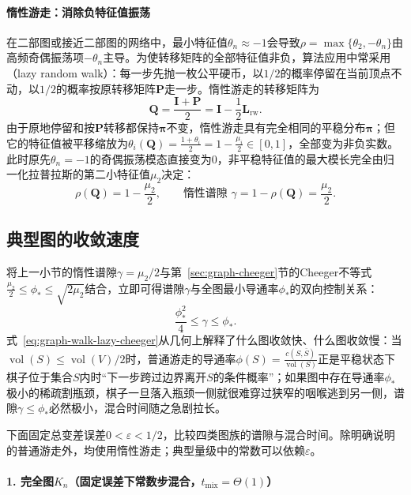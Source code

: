 \paragraph{惰性游走：消除负特征值振荡}

在二部图或接近二部图的网络中，最小特征值$\theta_n\approx -1$会导致$\rho=\max\{\theta_2,-\theta_n\}$由高频奇偶振荡项$-\theta_n$主导。为使转移矩阵的全部特征值非负，算法应用中常采用（lazy random walk）：每一步先抛一枚公平硬币，以$1/2$的概率停留在当前顶点不动，以$1/2$的概率按原转移矩阵$\bm P$走一步。惰性游走的转移矩阵为
\begin{equation}
\bm{Q}=\frac{\bm{I}+\bm{P}}{2}=\bm I - \frac12\bm L_{\mathrm{rw}}.
\label{eq:graph-walk-lazy-transition}
\end{equation}
由于原地停留和按$\bm P$转移都保持$\bm\pi$不变，惰性游走具有完全相同的平稳分布$\bm\pi$；但它的特征值被平移缩放为$\theta_i(\bm Q)=\frac{1+\theta_i}{2}=1-\frac{\mu_i}{2}\in[0,1]$，全部变为非负实数。此时原先$\theta_n=-1$的奇偶振荡模态直接变为$0$，非平稳特征值的最大模长完全由归一化拉普拉斯的第二小特征值$\mu_2$决定：
\[
  \rho(\bm Q) = 1 - \frac{\mu_2}{2},
  \qquad
  \text{惰性谱隙 } \gamma = 1 - \rho(\bm Q) = \frac{\mu_2}{2}.
\]

\subsection{典型图的收敛速度}
\label{sec:graph-walk-bottleneck}

将上一小节的惰性谱隙$\gamma=\mu_2/2$与第~\ref{sec:graph-cheeger}节的Cheeger不等式$\frac{\mu_2}{2}\leq\phi_*\leq\sqrt{2\mu_2}$结合，立即可得谱隙$\gamma$与全图最小导通率$\phi_*$的双向控制关系：
\begin{equation}
\frac{\phi_*^2}{4}\le\gamma\le\phi_*.
\label{eq:graph-walk-lazy-cheeger}
\end{equation}
式~\eqref{eq:graph-walk-lazy-cheeger}从几何上解释了什么图收敛快、什么图收敛慢：当$\operatorname{vol}(S)\leq\operatorname{vol}(V)/2$时，普通游走的导通率$\phi(S)=\frac{c(S,\bar S)}{\operatorname{vol}(S)}$正是平稳状态下棋子位于集合$S$内时“下一步跨过边界离开$S$的条件概率”；如果图中存在导通率$\phi_*$极小的稀疏割瓶颈，棋子一旦落入瓶颈一侧就很难穿过狭窄的咽喉逃到另一侧，谱隙$\gamma\leq\phi_*$必然极小，混合时间随之急剧拉长。

下面固定总变差误差$0<\varepsilon<1/2$，比较四类图族的谱隙与混合时间。除明确说明的普通游走外，均使用惰性游走；典型量级中的常数可以依赖$\varepsilon$。

\paragraph{1. 完全图$K_n$（固定误差下常数步混合，$t_{\mathrm{mix}}=\Theta(1)$）}

